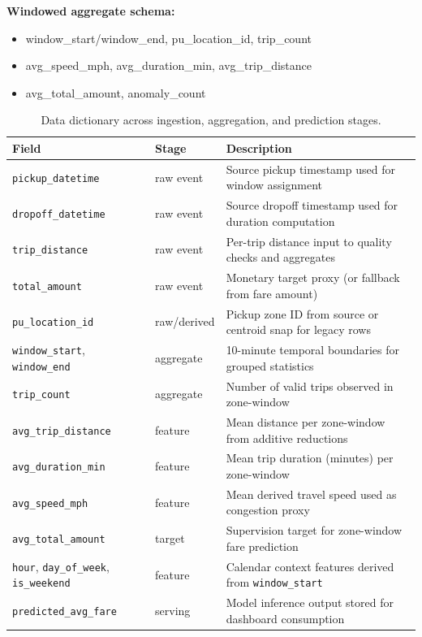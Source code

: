 \documentclass[conference]{IEEEtran}
\begin{document}
\textbf{Windowed aggregate schema:}
\begin{itemize}[leftmargin=1.5em]
    \item window\_start/window\_end, pu\_location\_id, trip\_count
    \item avg\_speed\_mph, avg\_duration\_min, avg\_trip\_distance
    \item avg\_total\_amount, anomaly\_count
\end{itemize}

\begin{table}[!t]
\centering
\begin{tabular}{lll}
\toprule
Field & Stage & Description \\
\midrule
\texttt{pickup\_datetime} & raw event & Source pickup timestamp used for window assignment \\
\texttt{dropoff\_datetime} & raw event & Source dropoff timestamp used for duration computation \\
\texttt{trip\_distance} & raw event & Per-trip distance input to quality checks and aggregates \\
\texttt{total\_amount} & raw event & Monetary target proxy (or fallback from fare amount) \\
\texttt{pu\_location\_id} & raw/derived & Pickup zone ID from source or centroid snap for legacy rows \\
\texttt{window\_start}, \texttt{window\_end} & aggregate & 10-minute temporal boundaries for grouped statistics \\
\texttt{trip\_count} & aggregate & Number of valid trips observed in zone-window \\
\texttt{avg\_trip\_distance} & feature & Mean distance per zone-window from additive reductions \\
\texttt{avg\_duration\_min} & feature & Mean trip duration (minutes) per zone-window \\
\texttt{avg\_speed\_mph} & feature & Mean derived travel speed used as congestion proxy \\
\texttt{avg\_total\_amount} & target & Supervision target for zone-window fare prediction \\
\texttt{hour}, \texttt{day\_of\_week}, \texttt{is\_weekend} & feature & Calendar context features derived from \texttt{window\_start} \\
\texttt{predicted\_avg\_fare} & serving & Model inference output stored for dashboard consumption \\
\bottomrule
\end{tabular}
\caption{Data dictionary across ingestion, aggregation, and prediction stages.}\label{tab:data_dictionary}
\end{table}
\end{document}
